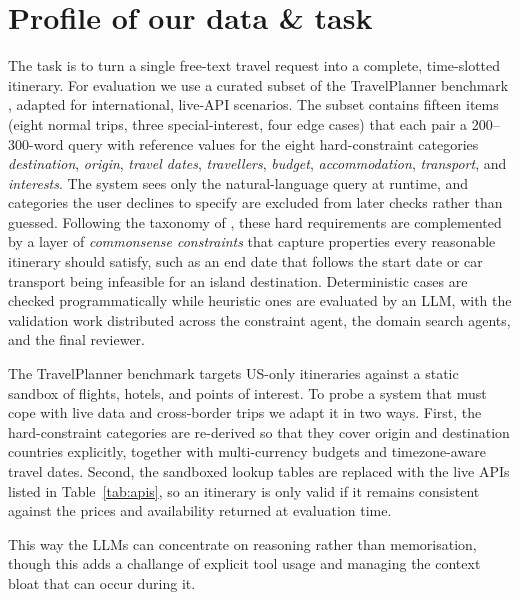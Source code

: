 \documentclass[a4paper,oneside,bibliography=totoc]{scrbook}
\begin{document}
\chapter{Profile of our data \& task}
\label{sec:data}

The task is to turn a single free-text travel request into a complete,
time-slotted itinerary. For evaluation we use a curated subset of the
TravelPlanner benchmark \cite{xie2024travelplanner}, adapted for
international, live-API scenarios. The subset contains fifteen items
(eight normal trips, three special-interest, four edge cases) that each
pair a 200--300-word query with reference values for the eight
hard-constraint categories \emph{destination}, \emph{origin},
\emph{travel dates}, \emph{travellers}, \emph{budget},
\emph{accommodation}, \emph{transport}, and \emph{interests}. The system
sees only the natural-language query at runtime, and categories the user
declines to specify are excluded from later checks rather than guessed.
Following the taxonomy of \cite{xie2024travelplanner}, these hard
requirements are complemented by a layer of \emph{commonsense
constraints} that capture properties every reasonable itinerary should
satisfy, such as an end date that follows the start date or car
transport being infeasible for an island destination. Deterministic
cases are checked programmatically while heuristic ones are evaluated
by an LLM, with the validation work distributed across the constraint
agent, the domain search agents, and the final reviewer.

The TravelPlanner benchmark targets US-only itineraries against a static
sandbox of flights, hotels, and points of interest. To probe a system
that must cope with live data and cross-border trips we adapt it in two
ways. First, the hard-constraint categories are re-derived so that they
cover origin and destination countries explicitly, together with
multi-currency budgets and timezone-aware travel dates. Second, the
sandboxed lookup tables are replaced with the live APIs listed in
Table~\ref{tab:apis}, so an itinerary is only valid if it remains
consistent against the prices and availability returned at evaluation
time.

This way the LLMs can concentrate on reasoning rather than memorisation, though this adds a challange of explicit tool usage and managing the context bloat that can occur during it.
\end{document}
